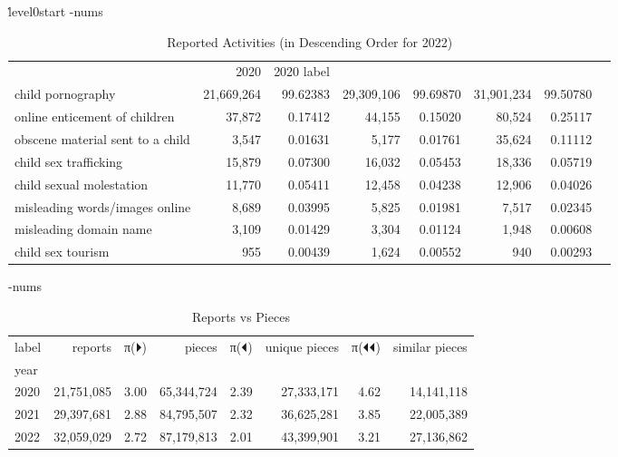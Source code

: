 \begin{table}
\centering
\caption{Reported Activities (in Descending Order for 2022)}
\.level0start
\tabular-nums
\begin{tabular}{lrrrrrr}
 & 2020 & 2020 %
label &  &  &  &  &  &  \\
child pornography & 21,669,264 & 99.62383 & 29,309,106 & 99.69870 & 31,901,234 & 99.50780 \\
online enticement of children & 37,872 & 0.17412 & 44,155 & 0.15020 & 80,524 & 0.25117 \\
obscene material sent to a child & 3,547 & 0.01631 & 5,177 & 0.01761 & 35,624 & 0.11112 \\
child sex trafficking & 15,879 & 0.07300 & 16,032 & 0.05453 & 18,336 & 0.05719 \\
child sexual molestation & 11,770 & 0.05411 & 12,458 & 0.04238 & 12,906 & 0.04026 \\
misleading words/images online & 8,689 & 0.03995 & 5,825 & 0.01981 & 7,517 & 0.02345 \\
misleading domain name & 3,109 & 0.01429 & 3,304 & 0.01124 & 1,948 & 0.00608 \\
child sex tourism & 955 & 0.00439 & 1,624 & 0.00552 & 940 & 0.00293 \\
\end{tabular}
\end{table}

\begin{table}
\centering
\caption{Reports vs Pieces}
\tabular-nums
\begin{tabular}{lrrrrrrr}
label & reports & π(⏵) & pieces & π(⏴) & unique pieces & π(⏴⏴) & similar pieces \\
year &  &  &  &  &  &  &  \\
2020 & 21,751,085 & 3.00 & 65,344,724 & 2.39 & 27,333,171 & 4.62 & 14,141,118 \\
2021 & 29,397,681 & 2.88 & 84,795,507 & 2.32 & 36,625,281 & 3.85 & 22,005,389 \\
2022 & 32,059,029 & 2.72 & 87,179,813 & 2.01 & 43,399,901 & 3.21 & 27,136,862 \\
\end{tabular}
\end{table}

